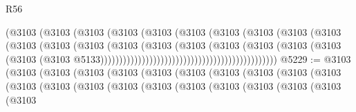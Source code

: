 \begin{lexlean}{R56}
\begin{coremodule}
                                                      (@3103
                                                        (@3103
                                                          (@3103
                                                            (@3103
                                                              (@3103
                                                                (@3103
                                                                  (@3103
                                                                    (@3103
                                                                      (@3103
                                                                        (@3103
                                                                          (@3103
                                                                            (@3103
                                                                              (@3103
                                                                                (@3103
                                                                                  (@3103
                                                                                    (@3103
                                                                                      (@3103
                                                                                        (@3103
                                                                                          (@3103
                                                                                            (@3103
                                                                                              (@3103
                                                                                                (@3103
                                                                                                  @5133)))))))))))))))))))))))))))))))))))))))))))))))
@5229 := @3103
    (@3103
      (@3103
        (@3103
          (@3103
            (@3103
              (@3103
                (@3103
                  (@3103
                    (@3103
                      (@3103
                        (@3103
                          (@3103
                            (@3103
                              (@3103
                                (@3103
                                  (@3103
                                    (@3103
                                      (@3103
                                        (@3103
                                          (@3103
                                            (@3103

\end{coremodule}
\end{lexlean}
